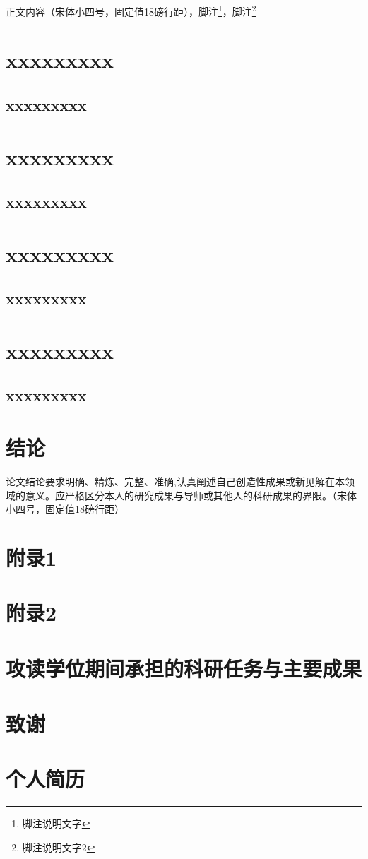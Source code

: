 \documentclass[master]{fnuthesis}
\begin{document}
正文内容（宋体小四号，固定值18磅行距），脚注\footnote{脚注说明文字}，脚注\footnote{脚注说明文字2}

\chapter{xxxxxxxxx}

\section{xxxxxxxxx}

\chapter{xxxxxxxxx}

\section{xxxxxxxxx}

\chapter{xxxxxxxxx}

\section{xxxxxxxxx}

\chapter{xxxxxxxxx}

\section{xxxxxxxxx}

\chapter{结论}

论文结论要求明确、精炼、完整、准确,认真阐述自己创造性成果或新见解在本领域的意义。应严格区分本人的研究成果与导师或其他人的科研成果的界限。（宋体小四号，固定值18磅行距）

\backmatter

\chapter{附录1}

\chapter{附录2}

\printbibliography[heading=bibnumbered]

\chapter{攻读学位期间承担的科研任务与主要成果}

\chapter{致谢}

\printindex

\chapter{个人简历}
\end{document}
